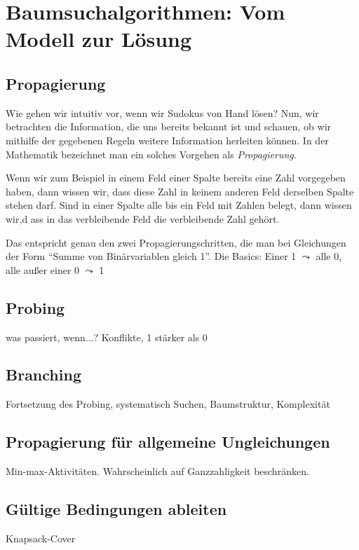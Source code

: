 \chapter{Baumsuchalgorithmen: Vom Modell zur Lösung}
\label{chap_technik}

\section{Propagierung}

Wie gehen wir intuitiv vor, wenn wir Sudokus von Hand lösen? Nun, wir
betrachten die Information, die uns bereits bekannt ist und schauen,
ob wir mithilfe der gegebenen Regeln weitere Information herleiten
können. In der Mathematik bezeichnet man ein solches Vorgehen als
\emph{Propagierung}.

Wenn wir zum Beispiel in einem Feld einer Spalte bereits eine Zahl vorgegeben
haben, dann wissen wir, dass diese Zahl in keinem anderen Feld
derselben Spalte stehen darf. Sind in einer Spalte alle bis ein Feld
mit Zahlen belegt, dann wissen wir,d ass in das verbleibende Feld die
verbleibende Zahl gehört.

Das entspricht genau den zwei Propagierungschritten, die man bei
Gleichungen der Form ``Summe von Binärvariablen gleich 1''.
Die Basics: Einer 1 $\leadsto$ alle 0, alle außer einer 0 $\leadsto$ 1

\section{Probing}
was passiert, wenn...? Konflikte, 1 stärker als 0

\section{Branching}
Fortsetzung des Probing, systematisch Suchen, Baumstruktur,
Komplexität

\section{Propagierung für allgemeine Ungleichungen}
Min-max-Aktivitäten. Wahrscheinlich auf Ganzzahligkeit beschränken.

\section{Gültige Bedingungen ableiten}
Knapsack-Cover
